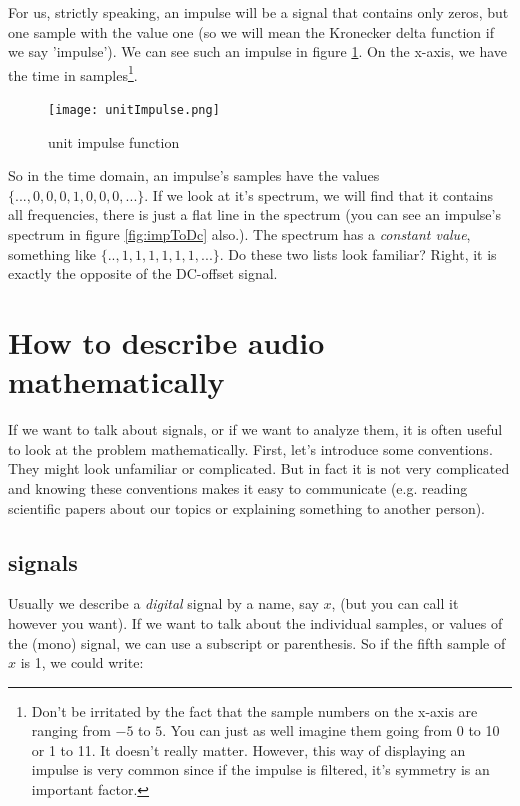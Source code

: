 For us, strictly speaking, an impulse will be a signal that contains only zeros, but one sample with the value one (so we will mean the Kronecker delta function if we say 'impulse'). We can see such an impulse in figure \ref{fig:unitImpulse}. On the x-axis, we have the time in samples\footnote{Don't be irritated by the fact that the sample numbers on the x-axis are ranging from $-5$ to $5$. You can just as well imagine them going from 0 to 10 or 1 to 11. It doesn't really matter. However, this way of displaying an impulse is very common since if the impulse is filtered, it's symmetry is an important factor.}.


\begin{figure}[H]
	\begin{center}
		\texttt{[image: unitImpulse.png]}
		\caption{unit impulse function}
		\label{fig:unitImpulse}
	\end{center}
\end{figure}

So in the time domain, an impulse's samples have the values $\{...,0,0,0,1,0,0,0,...\}$. If we look at it's spectrum, we will find that it contains all frequencies, there is just a flat line in the spectrum (you can see an impulse's spectrum in figure \ref{fig:impToDc} also.). The spectrum has a \textit{constant value}, something like $\{..,1,1,1,1,1,1,...\}$. Do these two lists look familiar? Right, it is exactly the opposite of the DC-offset signal.



\section{How to describe audio mathematically}

If we want to talk about signals, or if we want to analyze them, it is often useful to look at the problem mathematically. First, let's introduce some conventions. They might look unfamiliar or complicated. But in fact it is not very complicated and knowing these conventions makes it easy to communicate (e.g. reading scientific papers about our topics or explaining something to another person).

\subsection{signals}

Usually we describe a \textit{digital} signal by a name, say $x$, (but you can call it however you want). If we want to talk about the individual samples, or values of the (mono) signal, we can use a subscript or parenthesis. So if the fifth sample of $x$ is 1, we could write:

